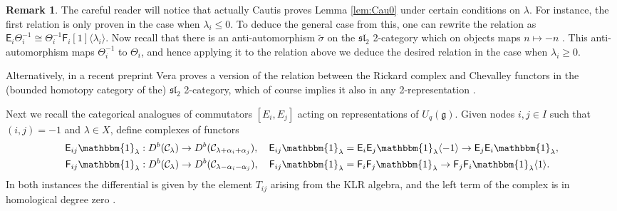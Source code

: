 \documentclass[11pt,reqno]{amsart}
\numberwithin{equation}{section}
\theoremstyle{definition}
\newtheorem{Remark}[equation]{Remark}
\theoremstyle{named}
\newcommand{\cC}{\mathcal{C}}
\newcommand{\sE}{\mathsf{E}}
\newcommand{\sF}{\mathsf{F}}
\newcommand{\fg}{\mathfrak{g}}
\renewcommand{\tilde}[1]{\widetilde{#1}}
\newcommand{\fsl}{\mathfrak{sl}}
\newcommand{\bone}{\mathbbm{1}}
\begin{document}
\begin{Remark}
The careful reader will notice that actually Cautis proves Lemma \ref{lem:Cau0} under certain conditions on $\lambda$.  For instance, the first relation is only proven in the case when $\lambda_i \leq 0$.  To deduce the general case from this, one can rewrite the relation
as $\sE_i \Theta_i^{-1}\cong \Theta_i^{-1}\sF_i[1]\langle \lambda_i \rangle$.  Now recall that there is an anti-automorphism $\tilde{\sigma}$ on the $\fsl_2$ 2-category which on objects maps $n \mapsto -n$ \cite[Section 5.6]{Laucq}.  This anti-automorphism maps $\Theta_i^{-1}$ to $\Theta_i$, and hence applying it to the relation above we deduce the desired relation in the case when $\lambda_i \geq 0$.

Alternatively, in a recent preprint Vera proves a version of the relation between the Rickard complex and Chevalley functors in the (bounded homotopy category of the) $\fsl_2$ 2-category, which of course implies it also in any 2-representation \cite{Vera}.
\end{Remark}

%

Next we recall the categorical analogues of commutators $[E_i,E_j]$ acting on representations of $U_q(\fg)$.  Given nodes $i,j\in I$ such that $(i,j)=-1$ and  $\lambda \in X$, define complexes of functors 
\begin{align*}
\sE_{ij}\bone_\lambda:D^b(\cC_\lambda) \to D^b(\cC_{\lambda+\alpha_i+\alpha_j}), \quad \sE_{ij}\bone_\lambda &=\sE_i\sE_j\bone_\lambda\langle-1\rangle \to \sE_j\sE_i\bone_\lambda, \\
\sF_{ij}\bone_\lambda: D^b(\cC_\lambda) \to D^b(\cC_{\lambda-\alpha_i-\alpha_j}), \quad \sF_{ij}\bone_\lambda &=\sF_i\sF_j\bone_\lambda \to \sF_j\sF_i\bone_\lambda\langle 1 \rangle.
\end{align*}
In both instances the differential  is given by the element $T_{ij}$ arising from the KLR algebra, and the left term of the complex is in homological degree zero \cite{Cauclasp}.
\end{document}
